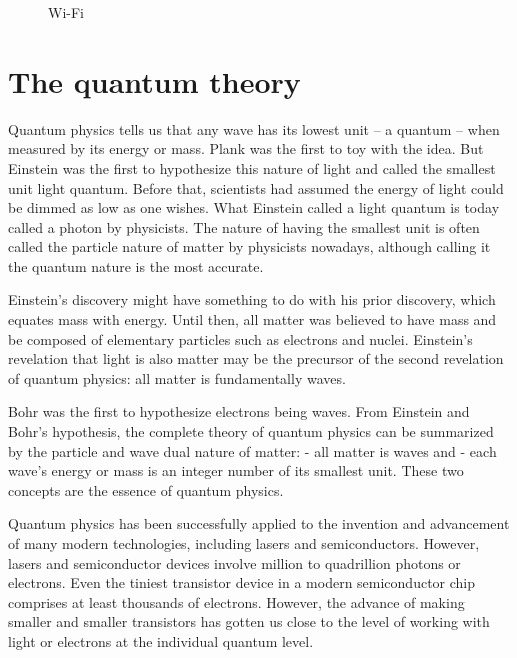 \documentclass[oneside, letter, 12pt]{book}
\begin{document}
\begin{figure}[h]\label{Room-WiFi}
\caption{Wi-Fi}
\end{figure}

\section{The quantum theory}
Quantum physics tells us that any wave has its lowest unit -- a quantum --  when measured by its energy or mass. Plank was the first to toy with the idea. But Einstein was the first to hypothesize this nature of light and called the smallest unit light quantum. Before that, scientists had assumed the energy of light could be dimmed as low as one wishes. What Einstein called a light quantum is today called a photon by physicists. The nature of having the smallest unit is often called the particle nature of matter by physicists nowadays, although calling it the quantum nature is the most accurate.

Einstein's discovery might have something to do with his prior discovery, which equates mass with energy. Until then, all matter was believed to have mass and be composed of elementary particles such as electrons and nuclei. Einstein's revelation that light is also matter may be the precursor of the second revelation of quantum physics: all matter is fundamentally waves.

Bohr was the first to hypothesize electrons being waves. From Einstein and Bohr's hypothesis, the complete theory of quantum physics can be summarized by the particle and wave dual nature of matter:
- all matter is waves and
- each wave's energy or mass is an integer number of its smallest unit.
These two concepts are the essence of quantum physics.

Quantum physics has been successfully applied to the invention and advancement of many modern technologies, including lasers and semiconductors. However, lasers and semiconductor devices involve million to quadrillion photons or electrons. Even the tiniest transistor device in a modern semiconductor chip comprises at least thousands of electrons. However, the advance of making smaller and smaller transistors has gotten us close to the level of working with light or electrons at the individual quantum level.
\end{document}
